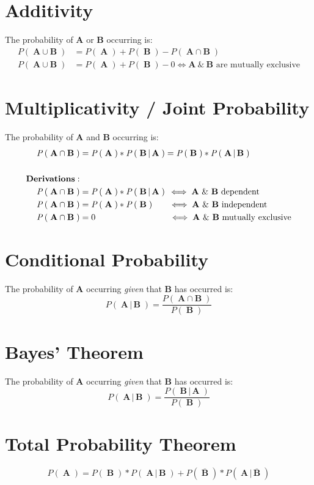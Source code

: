 \documentclass{article}
\newcommand{\Parens}[1]{\ensuremath{\left(\;#1\;\right)}\xspace}
\newcommand{\Prob}[1]{\ensuremath{\mathit{P}\Parens{#1}}\xspace}
\newcommand{\ProbGiven}[2]{\ensuremath{\mathit{P}\Parens{#1\,|\,#2}}\xspace}
\newcommand{\RandVar}[1]{\ensuremath{\mathbf{#1}}\xspace}
\begin{document}
\section*{Additivity}
The probability of \RandVar{A} or \RandVar{B} occurring is:
\begin{align*}
\Prob{\RandVar{A} \cup \RandVar{B}} &= \Prob{\RandVar{A}} + \Prob{\RandVar{B}} - \Prob{\RandVar{A} \cap \RandVar{B}}\\
\Prob{\RandVar{A} \cup \RandVar{B}} &= \Prob{\RandVar{A}} + \Prob{\RandVar{B}} - 0 \iff \RandVar{A}~\&~\RandVar{B} \text{~are mutually exclusive}
\end{align*}

\section*{Multiplicativity / Joint Probability}
The probability of \RandVar{A} and \RandVar{B} occurring is:
\begin{align*}
\Prob{\RandVar{A} \cap \RandVar{B}} &=  \Prob{\RandVar{A}} * \ProbGiven{\RandVar{B}}{\RandVar{A}} = \Prob{\RandVar{B}} * \ProbGiven{\RandVar{A}}{\RandVar{B}}\\
&\\
\mathbf{Derivations:} &\\
\Prob{\RandVar{A} \cap \RandVar{B}} &= \Prob{\RandVar{A}} * \ProbGiven{\RandVar{B}}{\RandVar{A}} \,\iff \RandVar{A}~\&~\RandVar{B} \text{~dependent} \\
\Prob{\RandVar{A} \cap \RandVar{B}} &= \Prob{\RandVar{A}} * \Prob{\RandVar{B}} \hspace*{6mm}\iff \RandVar{A}~\&~\RandVar{B} \text{~independent} \\
\Prob{\RandVar{A} \cap \RandVar{B}} &= 0 \hspace*{29mm}\,\iff \RandVar{A}~\&~\RandVar{B} \text{~mutually exclusive} \\
\end{align*}


\section*{Conditional Probability}
The probability of \RandVar{A} occurring \emph{given} that \RandVar{B} has occurred is:
$$\ProbGiven{\RandVar{A}}{\RandVar{B}} = \frac{\Prob{\RandVar{A} \cap \RandVar{B}}}{\Prob{\RandVar{B}}}$$


\section*{Bayes' Theorem}
The probability of \RandVar{A} occurring \emph{given} that \RandVar{B} has occurred is:
$$\ProbGiven{\RandVar{A}}{\RandVar{B}} = \frac{\ProbGiven{\RandVar{B}}{\RandVar{A}}}{\Prob{\RandVar{B}}}$$

\section*{Total Probability Theorem}
\[
\Prob{\RandVar{A}} = \Prob{\RandVar{B}}* \ProbGiven{\RandVar{A}}{\RandVar{B}} + \Prob{\overline{\RandVar{B}}}* \ProbGiven{\RandVar{A}}{\overline{\RandVar{B}}}
\]
\end{document}
